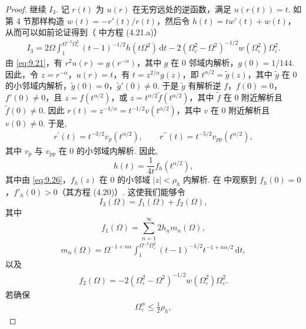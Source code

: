 \begin{proof}
继续 $I_{3}$. 记 $r(t)$ 为 $u(r)$ 在无穷远处的逆函数，满足 $u(r(t)) = t$. 如 \cite{b208} 第 4 节那样构造 $w(t) = -r'(t)/r(t)$，然后令 $h(t) = tw'(t) + w(t)$，从而可以如前论证得到（\cite{b208} 中方程 (4.21.a)）
\begin{align*}
  I_{3}=2\Omega\int_{1}^{\Omega^{-2}\Omega_{\varepsilon}^{2}}(t-1)^{-1/2}h(t\Omega^{2})\,\mathrm{d}t
  -2\left(\Omega_{\varepsilon}^{2}-\Omega^{2}\right)^{-1/2}w(\Omega_{\varepsilon}^{2})\Omega_{\varepsilon}^{2}.
\end{align*}
由 \eqref{eq:9.21}，有 $r^2u(r) = g(r^{-\alpha})$，其中 $g$ 在 $0$ 邻域内解析，$g(0) = 1/144$. 因此，令 $z = r^{-\alpha}$，$u(r) = t$，有 $t = z^{2/\alpha}g(z)$，即 $t^{\alpha/2} = \tilde{g}(z)$，其中 $\tilde{g}$ 在 $0$ 的小邻域内解析，$\tilde{g}(0) = 0$，$\tilde{g}'(0) \neq 0$. 于是 $\tilde{g}$ 有解析逆 $f$，$f(0) = 0$，$f'(0) \neq 0$，且 $z = f(t^{\alpha/2})$，或 $z = t^{\alpha/2}\tilde{f}(t^{\alpha/2})$，其中 $\tilde{f}$ 在 $0$ 附近解析且 $\tilde{f}(0) \neq 0$. 因此 $r(t) = z^{-1/\alpha} = t^{-1/2}v(t^{\alpha/2})$，其中 $v$ 在 $0$ 附近解析且 $v(0) \neq 0$. 于是,
\begin{align*}
  r^{\prime}(t)=t^{-3/2}v_{p}(t^{\alpha/2}),\qquad
  r^{\prime\prime}(t)=t^{-5/2}v_{pp}(t^{\alpha/2}),
\end{align*}
其中 $v_{p}$ 与 $v_{pp}$ 在 $0$ 的小邻域内解析. 因此,
\begin{equation}\label{eq:9.25}
  h(t)=\frac{1}{4t}f_{h}(t^{\alpha/2}),
\end{equation}
其中由 \eqref{eq:9.26}，$f_h(z)$ 在 $0$ 的小邻域 $|z| < \rho_h$ 内解析. 在 \cite{b208} 中观察到 $f_h(0) = 0$，$f'_h(0) > 0$（其方程 (4.20)）. 这使我们能够令
\begin{equation}\label{eq:9.26}
  I_{3}(\Omega)=f_{1}(\Omega)+f_{2}(\Omega),
\end{equation}
其中
\begin{equation}\label{eq:9.27}
  f_{1}(\Omega)=\sum_{n=1}^{\infty}2h_{n}m_{n}(\Omega),
\end{equation}
\begin{align*}
  m_{n}(\Omega)=\Omega^{-1+n\alpha}\int_{1}^{\Omega^{-2}\Omega_{\varepsilon}^{2}}
  (t-1)^{-1/2}t^{-1+n\alpha/2}\,\mathrm{d}t,
\end{align*}
以及
\begin{align*}
  f_{2}(\Omega)=-2\left(\Omega_{\varepsilon}^{2}-\Omega^{2}\right)^{-1/2}w(\Omega_{\varepsilon}^{2})\Omega_{\varepsilon}^{2}.
\end{align*}
若确保
\begin{align*}
  \Omega_{\varepsilon}^{\alpha}\leq\frac{1}{2}\rho_{h},

\end{align*}
\end{proof}
